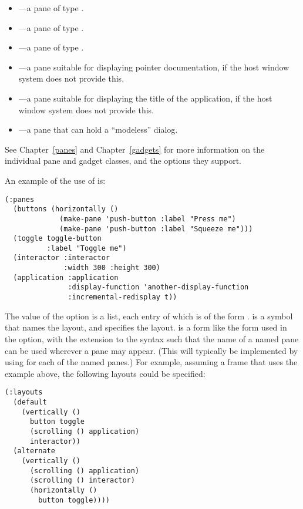 \begin{itemize}
\item {}---a pane of type .

\item {}---a pane of type .

\item {}---a pane of type .

\item {}---a pane suitable for displaying pointer
documentation, if the host window system does not provide this.

\item {}---a pane suitable for displaying the title of the application,
if the host window system does not provide this.

\item {}---a pane that can hold a ``modeless''
 dialog.
\end{itemize}

See Chapter~\ref{panes} and Chapter~\ref{gadgets} for more information on the
individual pane and gadget classes, and the options they support.

An example of the use of  is:

\begin{verbatim}
(:panes
  (buttons (horizontally ()
             (make-pane 'push-button :label "Press me")
             (make-pane 'push-button :label "Squeeze me")))
  (toggle toggle-button
          :label "Toggle me")
  (interactor :interactor
              :width 300 :height 300)
  (application :application
               :display-function 'another-display-function
               :incremental-redisplay t))
\end{verbatim}

The value of the  option is a list, each entry of which is of the
form .   is a symbol that names the layout, and
 specifies the layout.   is a form like the form used in
the  option, with the extension to the syntax such that the name of a
named pane can be used wherever a pane may appear.  (This will typically be
implemented by using  for each of the named panes.)  For
example, assuming a frame that uses the  example above, the following
layouts could be specified:

\begin{verbatim}
(:layouts
  (default
    (vertically ()
      button toggle
      (scrolling () application)
      interactor))
  (alternate
    (vertically ()
      (scrolling () application)
      (scrolling () interactor)
      (horizontally ()
        button toggle))))
\end{verbatim}

